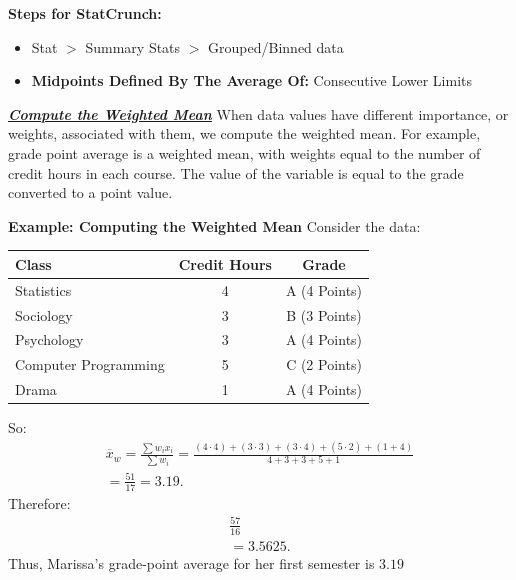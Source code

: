 \documentclass{report}
\begin{document}
         \bigbreak \noindent 
         \textbf{Steps for StatCrunch:}
         \begin{itemize}
             \item Stat $>$ Summary Stats $>$ Grouped/Binned data
            \item \textbf{Midpoints Defined By The Average Of:} \rightarrow Consecutive Lower Limits

         \end{itemize}

         \bigbreak \noindent \bigbreak \noindent 
         \textbf{\textit{\underline{Compute the Weighted Mean}}}
         \bigbreak \noindent 
         When data values have different importance, or weights, associated with them, we compute the weighted mean. For example, grade point average is a weighted mean, with weights equal to the number of credit hours in each course. The value of the variable is equal to the grade converted to a point value. 
         \bigbreak \noindent 
         \begin{mdframed}
           \textbf{Example: Computing the Weighted Mean}
           \bigbreak \noindent 
           Consider the data:
           \begin{center}
               \begin{center}
                   \begin{tabular}{|l|c|c|}
                   \hline
                   Class & Credit Hours & Grade \\
                   	\hline
                   Statistics & 4 	  & A (4 Points) \\
                   	\hline
                   Sociology & 3 & B (3 Points) \\
                   	\hline
                   Psychology & 3 & A (4 Points) \\
                   	\hline
                   Computer Programming & 5 & C (2 Points) \\
                   \hline
                   Drama & 1 & A (4 Points) \\
                   \hline
                   \end{tabular}
               \end{center}
           \end{center}
           \bigbreak \noindent 
           So:
           \begin{align*}
               \overline{x}_{w} = \frac{\sum w_{i}x_{i}}{\sum w_{i}} = \frac{(4\cdot 4) + ( 3\cdot 3) +  (3 \cdot 4) + (5 \cdot 2) + (1 + 4) }{4 + 3 + 3 + 5 + 1} \\
               = \frac{51}{17} =3.19
           .\end{align*}
           \bigbreak \noindent 
           Therefore:
           \begin{align*}
               \frac{57}{16} \\
               = 3.5625
           .\end{align*}
           \bigbreak \noindent 
           Thus, Marissa's grade-point average for her first semester is $3.19 $
           
         \end{mdframed}
\end{document}
